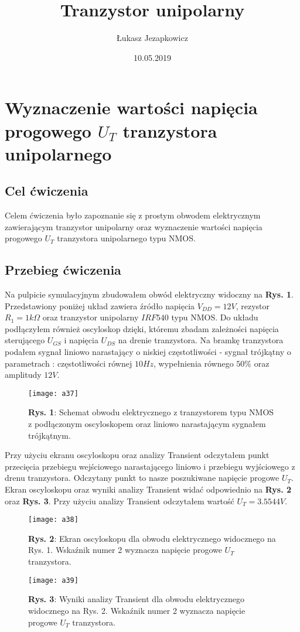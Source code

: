 \documentclass[11pt]{article}
\author{Łukasz Jezapkowicz}
\title{Tranzystor unipolarny}
\date{10.05.2019}
\begin{document}
\maketitle
\tableofcontents \newpage
\section{Wyznaczenie wartości napięcia progowego $U_T$ tranzystora unipolarnego}
\subsection{Cel ćwiczenia}
Celem ćwiczenia było zapoznanie się z prostym obwodem elektrycznym zawierającym tranzystor unipolarny oraz wyznaczenie wartości napięcia progowego $U_T$ tranzystora
unipolarnego typu NMOS.
\subsection{Przebieg ćwiczenia}
Na pulpicie symulacyjnym zbudowałem obwód elektryczny widoczny na \textbf{Rys. 1}. Przedstawiony poniżej układ zawiera źródło napięcia $V_{DD}=12V$, rezystor $R_1 = 1k\Omega$ oraz tranzystor unipolarny $IRF540$ typu NMOS. Do układu podłączyłem również oscyloskop dzięki, któremu zbadam zależności napięcia sterującego $U_{GS}$ i napięcia $U_{DS}$ na drenie tranzystora. Na bramkę tranzystora podałem sygnał liniowo narastający o niskiej częstotliwości - sygnał trójkątny o parametrach : częstotliwości równej $10Hz$, wypełnienia równego $50\%$ oraz amplitudy $12V$.
\begin{figure}[H]
\centering
\texttt{[image: a37]}
\caption*{\textbf{Rys. 1}: Schemat obwodu elektrycznego z tranzystorem typu NMOS z podłączonym oscyloskopem oraz liniowo narastającym sygnałem trójkątnym. }
\end{figure}
\noindent Przy użyciu ekranu oscyloskopu oraz analizy Transient odczytałem punkt przecięcia przebiegu wejściowego narastającego liniowo i przebiegu wyjściowego z drenu tranzystora. Odczytany punkt to nasze poszukiwane napięcie progowe $U_T$. Ekran oscyloskopu oraz wyniki analizy Transient widać odpowiednio na \textbf{Rys. 2} oraz \textbf{Rys. 3}. Przy użyciu analizy Transient odczytałem wartość $U_T = 3.5544 V $.
\begin{figure}[H]
\centering
\texttt{[image: a38]}
\caption*{\textbf{Rys. 2}: Ekran oscyloskopu dla obwodu elektrycznego widocznego na Rys. 1. Wskaźnik numer 2 wyznacza napięcie progowe $U_T$ tranzystora. }
\end{figure}
\begin{figure}[H]
\centering
\texttt{[image: a39]}
\caption*{\textbf{Rys. 3}: Wyniki analizy Transient dla obwodu elektrycznego widocznego na Rys. 2. Wskaźnik numer 2 wyznacza napięcie progowe $U_T$ tranzystora. }
\end{figure}
\end{document}
